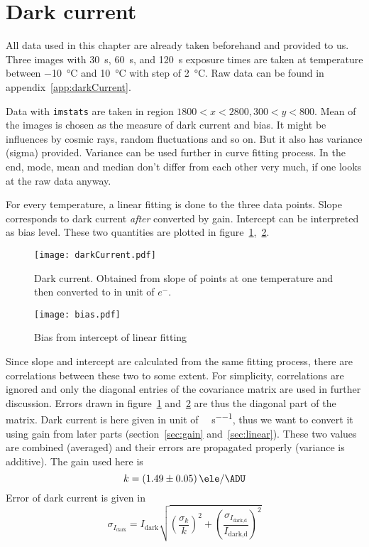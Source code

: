 \clearpage
\section{Dark current}
All data used in this chapter are already taken beforehand and provided to us. Three images with \SI{30}{\s}, \SI{60}{\s}, and \SI{120}{\s} exposure times are taken at temperature between \SI{-10}{\degreeCelsius} and \SI{10}{\degreeCelsius} with step of \SI{2}{\degreeCelsius}. Raw data can be found in appendix~\ref{app:darkCurrent}.

Data with \verb|imstats| are taken in region $1800 < x < 2800, 300 < y < 800$. Mean of the images is chosen as the measure of dark current and bias. It might be influences by cosmic rays, random fluctuations and so on. But it also has variance (sigma) provided. Variance can be used further in curve fitting process. In the end, mode, mean and median don't differ from each other very much, if one looks at the raw data anyway.

For every temperature, a linear fitting is done to the three data points. Slope corresponds to dark current \textit{after} converted by gain. Intercept can be interpreted as bias level. These two quantities are plotted in figure~\ref{fig:darkCurrent},~\ref{fig:bias}.
\begin{figure}[ht]
	\centering
	\texttt{[image: darkCurrent.pdf]}
	\caption{Dark current. Obtained from slope of points at one temperature and then converted to in unit of $e^-$.}%
	\label{fig:darkCurrent}
\end{figure}
\begin{figure}[ht]
	\centering
	\texttt{[image: bias.pdf]}
	\caption{Bias from intercept of linear fitting}%
	\label{fig:bias}
\end{figure}

Since slope and intercept are calculated from the same fitting process, there are correlations between these two to some extent. For simplicity, correlations are ignored and only the diagonal entries of the covariance matrix are used in further discussion. Errors drawn in figure~\ref{fig:darkCurrent} and~\ref{fig:bias} are thus the diagonal part of the matrix. Dark current is here given in unit of \si{\ele\per\px\per\s}, thus we want to convert it using gain from later parts (section~\ref{sec:gain} and~\ref{sec:linear}). These two values are combined (averaged) and their errors are propagated properly (variance is additive). The gain used here is
\begin{equation*}
	k = \SI{1.49 +- 0.05}{\ele\per\ADU}
\end{equation*}
Error of dark current is given in
\begin{equation*}
	\sigma_{I_\text{dark}} = I_\text{dark} \sqrt{ \left( \frac{\sigma_k}{k} \right)^2 + \left( \frac{\sigma_{I_{\text{dark,d}}}}{I_{\text{dark,d}}} \right)^2  }	
\end{equation*}

